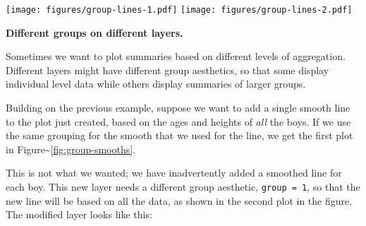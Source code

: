 \begin{Shaded}
\begin{Highlighting}[]
\NormalTok{)}
 \NormalTok{)}
\NormalTok{)}
\end{Highlighting}
\end{Shaded}

\texttt{[image: figures/group-lines-1.pdf]}
\texttt{[image: figures/group-lines-2.pdf]}

\textbf{Different groups on different layers.}

Sometimes we want to plot summaries based on different levels of
aggregation. Different layers might have different group aesthetics, so
that some display individual level data while others display summaries
of larger groups.

Building on the previous example, suppose we want to add a single smooth
line to the plot just created, based on the ages and heights of
\emph{all} the boys. If we use the same grouping for the smooth that we
used for the line, we get the first plot in
Figure\textasciitilde{}\ref{fig:group-smooths}. 

\begin{Shaded}
\begin{Highlighting}[]
\StringTok{ }\NormalTok{(}\NormalTok{(} \NormalTok{, } 
\end{Highlighting}
\end{Shaded}

This is not what we wanted; we have inadvertently added a smoothed line
for each boy. This new layer needs a different group aesthetic,
\texttt{group = 1}, so that the new line will be based on all the data,
as shown in the second plot in the figure. The modified layer looks like
this:

\begin{Shaded}
\begin{Highlighting}[]
\StringTok{ }\NormalTok{(}\NormalTok{(} \NormalTok{), }\NormalTok{, } \NormalTok{, } 
\end{Highlighting}
\end{Shaded}

